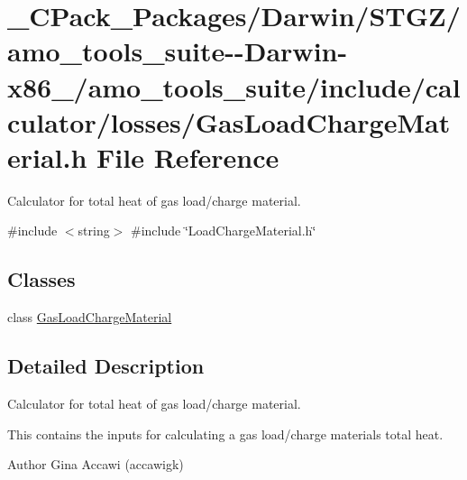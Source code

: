 \hypertarget{___c_pack___packages_2_darwin_2_s_t_g_z_2amo__tools__suite--_darwin-x86__64_2amo__tools__suite_26a031588b5d802b3ba6009030a7c132e}{}\section{\+\_\+\+C\+Pack\+\_\+\+Packages/\+Darwin/\+S\+T\+G\+Z/amo\+\_\+tools\+\_\+suite-\/-\/\+Darwin-\/x86\+\_/amo\+\_\+tools\+\_\+suite/include/calculator/losses/\+Gas\+Load\+Charge\+Material.h File Reference}
\label{___c_pack___packages_2_darwin_2_s_t_g_z_2amo__tools__suite--_darwin-x86__64_2amo__tools__suite_26a031588b5d802b3ba6009030a7c132e}


Calculator for total heat of gas load/charge material.  


{\ttfamily \#include $<$string$>$}\newline
{\ttfamily \#include \char`\"{}Load\+Charge\+Material.\+h\char`\"{}}\newline
\subsection*{Classes}
\begin{DoxyCompactItemize}
\item 
class \hyperlink{class_gas_load_charge_material}{Gas\+Load\+Charge\+Material}
\end{DoxyCompactItemize}


\subsection{Detailed Description}
Calculator for total heat of gas load/charge material. 

This contains the inputs for calculating a gas load/charge material\textquotesingle{}s total heat.

\begin{DoxyAuthor}{Author}
Gina Accawi (accawigk) 
\end{DoxyAuthor}
